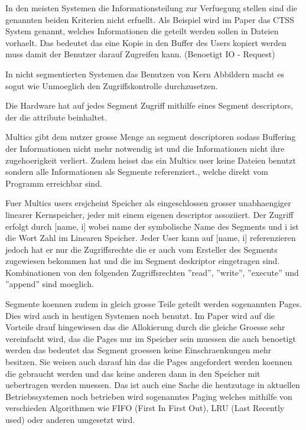 \documentclass[9pt,technote]{IEEEtran}
\begin{document}
		  In den meisten Systemen die Informationsteilung zur Verfuegung stellen sind die genannten beiden Kriterien nicht erfuellt.
		  Als Beispiel wird im Paper \cite{inproc:multics} das CTSS System genannt, welches Informationen die geteilt werden sollen in Dateien vorhaelt.
		  Das bedeutet das eine Kopie in den Buffer des Users kopiert werden muss damit der Benutzer darauf Zugreifen kann. (Benoetigt IO - Request)
		  
		  In nicht segmentierten Systemen das Benutzen von Kern Abbildern macht es sogut wie Unmoeglich den Zugriffskontrolle durchzusetzen.
		  
		 Die Hardware hat auf jedes Segment Zugriff mithilfe eines Segment descriptors, der die attribute beinhaltet.
		 
		 Multics gibt dem nutzer grosse Menge an segment descriptoren sodass Buffering der Informationen nicht mehr notwendig ist und die Informationen nicht
		 ihre zugehoerigkeit verliert. Zudem heisst das ein Multics user keine Dateien benutzt sondern alle Informationen
		 als Segmente referenziert., welche direkt vom Programm erreichbar sind.
		 
		 Fuer Multics users ersjcheint Speicher als eingeschlossen grosser unabhaengiger linearer Kernspeicher, jeder mit einem eigenen descriptor assoziiert. 
		 Der Zugriff erfolgt durch [name, i] wobei name der symbolische Name des Segments und i ist die Wort Zahl im Linearen Speicher.
		 Jeder User kann auf [name, i] referenzieren jedoch hat er nur die Zugriffsrechte die er auch vom Ersteller des Segments zugewiesen bekommen hat
		 und die im Segment deskriptor eingetragen sind. Kombinationen von den folgenden Zugriffsrechten ''read'', ''write'', ''execute'' und ''append'' sind moeglich.
		 
		 Segmente koennen zudem in gleich grosse Teile geteilt werden sogenannten Pages. Dies wird auch in heutigen Systemen noch benutzt.
		 Im Paper \cite{inproc:multics} wird auf die Vorteile drauf hingewiesen das die Allokierung durch die gleiche Groesse sehr vereinfacht wird,
		 das die Pages nur im Speicher sein muessen die auch benoetigt werden das bedeutet das Segment groessen keine Einschraenkungen mehr besitzen.
		 Sie weisen auch darauf hin das die Pages angefordert werden koennen die gebraucht 
		 werden und das keine anderen dann in den Speicher mit uebertragen werden muessen.
		 Das ist auch eine Sache die heutzutage in aktuellen Betriebssystemen noch betrieben wird sogenanntes Paging welches mithilfe von
		 verschieden Algorithmen wie FIFO (First In First Out), LRU (Last Recently used) oder anderen umgesetzt wird.
		 
\end{document}
